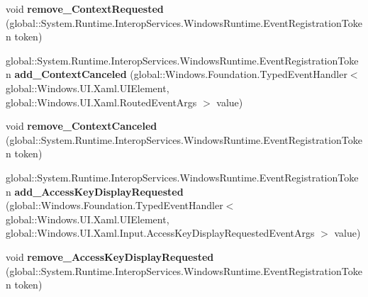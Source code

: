 \begin{DoxyCompactItemize}
\item 
\mbox{\label{interface_windows_1_1_u_i_1_1_xaml_1_1_i_u_i_element4_abdaa8213b321663c768808ee50570eb8}} 
void {\bfseries remove\+\_\+\+Context\+Requested} (global\+::\+System.\+Runtime.\+Interop\+Services.\+Windows\+Runtime.\+Event\+Registration\+Token token)
\item 
\mbox{\label{interface_windows_1_1_u_i_1_1_xaml_1_1_i_u_i_element4_a9ade4191c6e4d4e8692b363604d2e6cf}} 
global\+::\+System.\+Runtime.\+Interop\+Services.\+Windows\+Runtime.\+Event\+Registration\+Token {\bfseries add\+\_\+\+Context\+Canceled} (global\+::\+Windows.\+Foundation.\+Typed\+Event\+Handler$<$ global\+::\+Windows.\+U\+I.\+Xaml.\+U\+I\+Element, global\+::\+Windows.\+U\+I.\+Xaml.\+Routed\+Event\+Args $>$ value)
\item 
\mbox{\label{interface_windows_1_1_u_i_1_1_xaml_1_1_i_u_i_element4_ac9d7657d497cc4bd420335a23752824f}} 
void {\bfseries remove\+\_\+\+Context\+Canceled} (global\+::\+System.\+Runtime.\+Interop\+Services.\+Windows\+Runtime.\+Event\+Registration\+Token token)
\item 
\mbox{\label{interface_windows_1_1_u_i_1_1_xaml_1_1_i_u_i_element4_a35fc44f1af8aacfcb2a3ff829fcb7d50}} 
global\+::\+System.\+Runtime.\+Interop\+Services.\+Windows\+Runtime.\+Event\+Registration\+Token {\bfseries add\+\_\+\+Access\+Key\+Display\+Requested} (global\+::\+Windows.\+Foundation.\+Typed\+Event\+Handler$<$ global\+::\+Windows.\+U\+I.\+Xaml.\+U\+I\+Element, global\+::\+Windows.\+U\+I.\+Xaml.\+Input.\+Access\+Key\+Display\+Requested\+Event\+Args $>$ value)
\item 
\mbox{\label{interface_windows_1_1_u_i_1_1_xaml_1_1_i_u_i_element4_aea049ec23f1d2f3b558644a30bbda62d}} 
void {\bfseries remove\+\_\+\+Access\+Key\+Display\+Requested} (global\+::\+System.\+Runtime.\+Interop\+Services.\+Windows\+Runtime.\+Event\+Registration\+Token token)
\item 
\mbox{\label{interface_windows_1_1_u_i_1_1_xaml_1_1_i_u_i_element4_a9d51d9f59f40a6fabc504798338e3514}} 

\end{DoxyCompactItemize}
